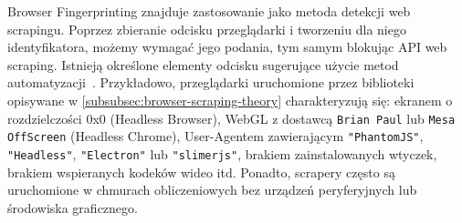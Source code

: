 Browser Fingerprinting znajduje zastosowanie jako metoda detekcji web scrapingu.
Poprzez zbieranie odcisku przeglądarki i tworzeniu dla niego identyfikatora, możemy wymagać jego podania, tym samym blokując API web scraping.
Istnieją określone elementy odcisku sugerujące użycie metod automatyzacji~\cite{zenrows-browser-fingerprinting}.
Przykładowo, przeglądarki uruchomione przez biblioteki opisywane w \autoref{subsubsec:browser-scraping-theory} charakteryzują się:
ekranem o rozdzielczości 0x0 (Headless Browser),
WebGL z dostawcą \texttt{Brian Paul} lub \texttt{Mesa OffScreen} (Headless Chrome),
User-Agentem zawierającym \texttt{"PhantomJS"}, \texttt{"Headless"}, \texttt{"Electron"} lub \texttt{"slimerjs"},
brakiem zainstalowanych wtyczek, brakiem wspieranych kodeków wideo itd.
Ponadto, scrapery często są uruchomione w chmurach obliczeniowych bez urządzeń peryferyjnych lub środowiska graficznego.

